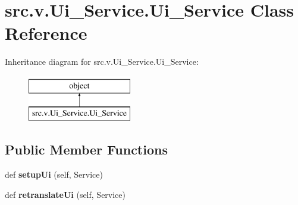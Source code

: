 \hypertarget{classsrc_1_1v_1_1_ui___service_1_1_ui___service}{}\section{src.\+v.\+Ui\+\_\+\+Service.\+Ui\+\_\+\+Service Class Reference}
\label{classsrc_1_1v_1_1_ui___service_1_1_ui___service}
Inheritance diagram for src.\+v.\+Ui\+\_\+\+Service.\+Ui\+\_\+\+Service\+:\begin{figure}[H]
\begin{center}
\leavevmode
\includegraphics[height=2.000000cm]{classsrc_1_1v_1_1_ui___service_1_1_ui___service}
\end{center}
\end{figure}
\subsection*{Public Member Functions}
\begin{DoxyCompactItemize}
\item 
\hypertarget{classsrc_1_1v_1_1_ui___service_1_1_ui___service_a3676d6481444e46625e77e636d210bb5}{}def {\bfseries setup\+Ui} (self, Service)\label{classsrc_1_1v_1_1_ui___service_1_1_ui___service_a3676d6481444e46625e77e636d210bb5}

\item 
\hypertarget{classsrc_1_1v_1_1_ui___service_1_1_ui___service_a283d5d8733f6d77055162787b3a320e0}{}def {\bfseries retranslate\+Ui} (self, Service)\label{classsrc_1_1v_1_1_ui___service_1_1_ui___service_a283d5d8733f6d77055162787b3a320e0}

\end{DoxyCompactItemize}
